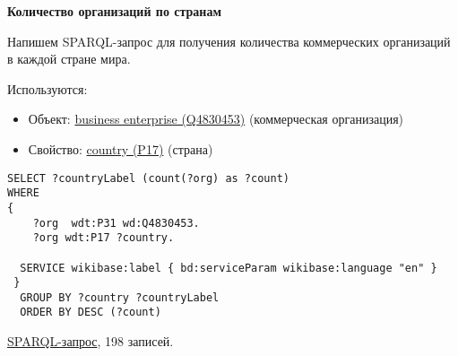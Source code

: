\textbf{Количество организаций по странам}

Напишем SPARQL-запрос для получения количества коммерческих организаций в каждой стране мира.

Используются:
\begin{itemize}
    \item Объект: \href{https://www.wikidata.org/wiki/Q4830453}{business enterprise (Q4830453)} (коммерческая организация)
    \item Свойство: \href{https://www.wikidata.org/wiki/Property:P17}{country (P17)} (страна)
\end{itemize}

\begin{lstlisting}[language=SPARQL]
SELECT ?countryLabel (count(?org) as ?count)
WHERE
{
    ?org  wdt:P31 wd:Q4830453.
    ?org wdt:P17 ?country.

  SERVICE wikibase:label { bd:serviceParam wikibase:language "en" }
 }
  GROUP BY ?country ?countryLabel
  ORDER BY DESC (?count)
\end{lstlisting}

\href{https://query.wikidata.org/#SELECT%20%3FcountryLabel%20%28count%28%3Forg%29%20as%20%3Fcount%29%0AWHERE%0A%7B%0A%20%20%20%20%3Forg%20%20wdt%3AP31%20wd%3AQ4830453.%0A%20%20%20%20%3Forg%20wdt%3AP17%20%3Fcountry.%0A%0A%20%20SERVICE%20wikibase%3Alabel%20%7B%20bd%3AserviceParam%20wikibase%3Alanguage%20%22en%22%20%7D%0A%20%7D%0A%20%20GROUP%20BY%20%3Fcountry%20%3FcountryLabel%0A%20%20ORDER%20BY%20DESC%20%28%3Fcount%29%0A}{SPARQL-запрос}, 198 записей.
